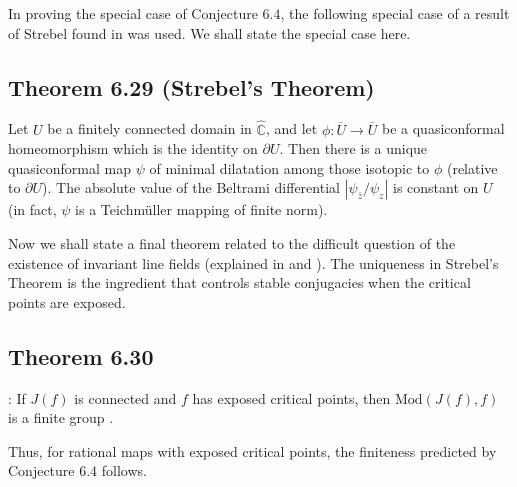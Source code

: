 \documentclass[11pt,a4paper]{article}
\begin{document}

   In proving the special case of Conjecture $6.4$, the following special case of a result of Strebel found in \cite{MR505549} was used. We shall state the special case here.

   \subsection*{Theorem 6.29 (Strebel's Theorem)} Let $U$ be a finitely connected domain in $\hat{\mathbb{C}}$, and let $\phi:\overline{U} \rightarrow \overline{U}$ be a quasiconformal homeomorphism which is the identity on $\partial U$. Then there is a unique quasiconformal map $\psi$ of minimal dilatation among those isotopic to $\phi$ (relative to $\partial U$). The absolute value of the Beltrami differential $|\psi_{\bar{z}}/\psi_z|$ is constant on $U$ (in fact, $\psi$ is a Teichm\"uller mapping of finite norm).



   Now we shall state a final theorem related to the difficult question of the existence of invariant line fields (explained in \cite{mcmullen1994frontiers} and \cite{mcmullen2016complex}). The uniqueness in Strebel's Theorem is the ingredient that controls stable conjugacies when the critical points are exposed.

   \subsection*{Theorem 6.30}: If $J(f)$ is connected and $f$ has exposed critical points, then $\text{Mod}(J(f), f)$ is a finite group \cite{mcmullen1988automorphisms}.

   Thus, for rational maps with exposed critical points, the finiteness predicted by Conjecture $6.4$ follows.



\end{document}
